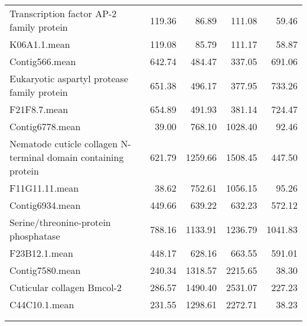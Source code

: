 \begin{longtable}{p{7cm}rrrr}
  Transcription factor AP-2 family protein & 119.36 & 86.89 & 111.08 & 59.46 \\ 
  K06A1.1.mean & 119.08 & 85.79 & 111.17 & 58.87 \\ 
   \hline
Contig566.mean & 642.74 & 484.47 & 337.05 & 691.06 \\ 
  Eukaryotic aspartyl protease family protein & 651.38 & 496.17 & 377.95 & 733.26 \\ 
  F21F8.7.mean & 654.89 & 491.93 & 381.14 & 724.47 \\ 
   \hline
Contig6778.mean & 39.00 & 768.10 & 1028.40 & 92.46 \\ 
  Nematode cuticle collagen N-terminal domain containing protein & 621.79 & 1259.66 & 1508.45 & 447.50 \\ 
  F11G11.11.mean & 38.62 & 752.61 & 1056.15 & 95.26 \\ 
   \hline
Contig6934.mean & 449.66 & 639.22 & 632.23 & 572.12 \\ 
  Serine/threonine-protein phosphatase & 788.16 & 1133.91 & 1236.79 & 1041.83 \\ 
  F23B12.1.mean & 448.17 & 628.16 & 663.55 & 591.01 \\ 
   \hline
Contig7580.mean & 240.34 & 1318.57 & 2215.65 & 38.30 \\ 
  Cuticular collagen Bmcol-2 & 286.57 & 1490.40 & 2531.07 & 227.23 \\ 
  C44C10.1.mean & 231.55 & 1298.61 & 2272.71 & 38.23 \\ 
  \hline\\
\label{eel.sing.diff}
\end{longtable}


